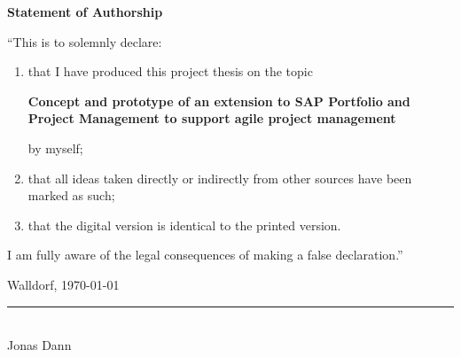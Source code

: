 {\Large \textbf{Statement of Authorship}}
\vspace{15mm}

“This is to solemnly declare:

\begin{enumerate}
	\item that I have produced this project thesis on the topic
\begin{center}\textbf{Concept and prototype of an extension to SAP Portfolio and Project Management to support agile project management}\end{center}
by myself;
	\item that all ideas taken directly or indirectly from other sources have been marked as such;
	\item that the digital version is identical to the printed version.
\end{enumerate}

I am fully aware of the legal consequences of making a false declaration.”
 
\vspace{2cm} 
Walldorf, \today
\vspace{0.5cm} 	
\begin{multicols}{3}
	\vspace{2cm}	
	\rule{5cm}{.1pt}\\
	\vspace{5mm}
	Jonas Dann
\end{multicols}